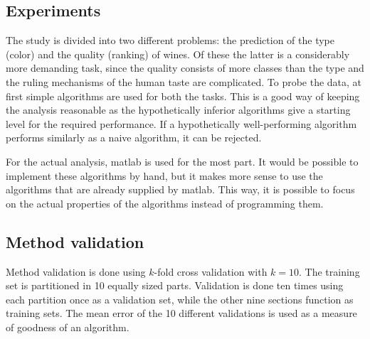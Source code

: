 \documentclass[twoside]{article}
\begin{document}
\begin{multicols}{2}


\section{Experiments}

The study is divided into two different problems: the prediction of the type (color) and the quality (ranking)
of wines. Of these the latter is a considerably more demanding task, since the quality consists of more classes than the type and the
ruling mechanisms of the human taste are complicated. To probe the data, at first simple algorithms are used for 
both the tasks. This is a good way of keeping the analysis reasonable as
the hypothetically inferior algorithms give a starting level for the required performance. If a hypothetically
well-performing algorithm performs similarly as a naive algorithm, it can be rejected.

For the actual analysis, matlab is used for the most part. It would be possible to implement these algorithms by hand,
but it makes more sense to use the algorithms that are already supplied by matlab. This way, it is possible to focus
on the actual properties of the algorithms instead of programming them.

\subsection{Method validation}

Method validation is done using $k$-fold cross validation with $k = 10$. The training set is partitioned in 10 equally sized parts. 
Validation is done ten times using each partition once as a validation set, while the other nine
sections function as training sets. The mean error of the 10 different validations is used as a measure
of goodness of an algorithm.


\end{multicols}
\end{document}
